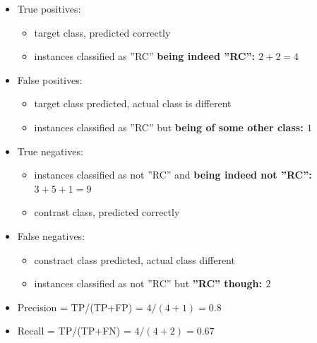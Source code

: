 \begin{breakbox}
\begin{itemize}
	\item True positives:
	\begin{itemize}
		\item target class, predicted correctly
		\item instances classified as ''RC'' \textbf{being indeed ''RC'': $2+2=4$}
	\end{itemize}
	\item False positives:
		\begin{itemize}
			\item target class predicted, actual class is different
			\item instances classified as ''RC'' but \textbf{being of some other class: $1$}		
		\end{itemize}
	\item True negatives:
		\begin{itemize}
			\item instances classified as not ''RC'' and \textbf{being indeed not ''RC'': $3 + 5 + 1 = 9$}
			\item contrast class, predicted correctly
		\end{itemize}
	\item False negatives: 
		\begin{itemize}
			\item constract class predicted, actual class different
			\item instances classified as not ''RC'' but \textbf{''RC'' though: $2$}
		\end{itemize}
	\item Precision = TP/(TP+FP) = $4/(4+1)=0.8$
	\item Recall = TP/(TP+FN) = $4/(4+2)=0.67$
\end{itemize}



\end{breakbox}

